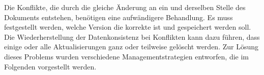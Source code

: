 Die Konflikte, die durch die gleiche Änderung an ein und derselben Stelle des Dokuments entstehen, benötigen eine aufwändigere Behandlung.
Es muss festgestellt werden, welche Version die korrekte ist und gespeichert werden soll.
Die Wiederherstellung der Datenkonsistenz bei Konflikten kann dazu führen, dass einige oder alle Aktualisierungen ganz oder teilweise gelöscht werden.
Zur Lösung dieses Problems wurden verschiedene Managementstrategien entworfen, die im Folgenden vorgestellt werden.
%
%

